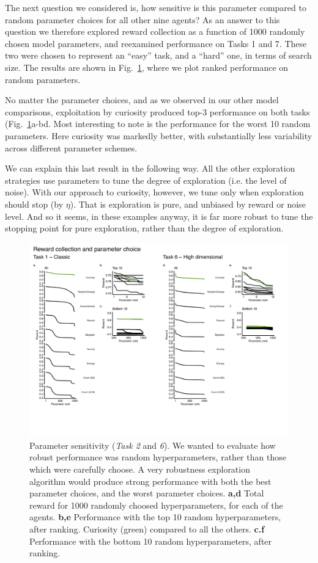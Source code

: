 The next question we considered is, how sensitive is this parameter compared to random parameter choices for all other nine agents? As an answer to this question we therefore explored reward collection as a function of 1000 randomly chosen model parameters, and reexamined performance on Tasks 1 and 7. These two were chosen to represent an ``easy'' task, and a ``hard'' one, in terms of search size. The results are shown in Fig.~\ref{fig:robust}, where we plot ranked performance on random parameters. 

No matter the parameter choices, and as we observed in our other model comparisons, exploitation by curiosity produced top-3 performance on both tasks (Fig.~\ref{fig:robust}a-bd. Most interesting to note is the performance for the worst 10 random parameters. Here curiosity was markedly better, with substantially less variability across different parameter schemes. 

We can explain this last result in the following way. All the other exploration strategies use parameters to tune the degree of exploration (i.e. the level of noise). With our approach to curiosity, however, we tune only when exploration should stop (by $\eta$). That is exploration is pure, and unbiased by reward or noise level. And so it seems, in these examples anyway, it is far more robust to tune the stopping point for pure exploration, rather than the degree of exploration.

\begin{figure}
    \label{fig:summary} 
	\includegraphics[width=11.4cm]{img/robust.pdf} 
	\caption{Parameter sensitivity (\textit{Task 2} and \textit{6}). We wanted to evaluate how robust performance was random hyperparameters, rather than those which were carefully choose. A very robustness exploration algorithm would produce strong performance with both the best parameter choices, and the worst parameter choices. 
	\textbf{a,d} Total reward for 1000 randomly choosed hyperparameters, for each of the agents.
	\textbf{b,e} Performance with the top 10 random hyperparameters, after ranking. Curiosity (green) compared to all the others.
	\textbf{c.f} Performance with the bottom 10 random hyperparameters, after ranking.
	}
	\label{fig:robust}
\end{figure}


